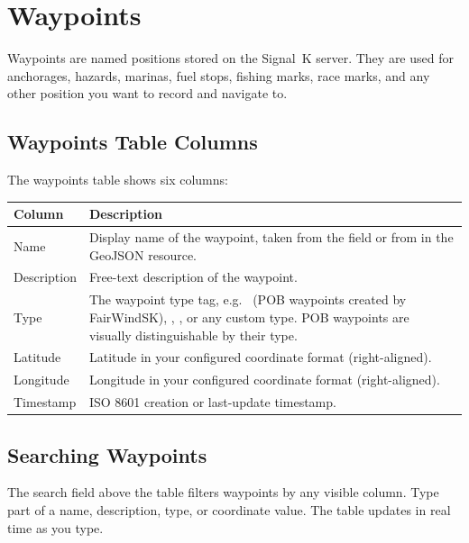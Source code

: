 \chapter{Waypoints}
\label{ch:waypoints}

Waypoints are named positions stored on the Signal~K server.
They are used for anchorages, hazards, marinas, fuel stops, fishing marks, race marks, and any
other position you want to record and navigate to.


\section{Waypoints Table Columns}

The waypoints table shows six columns:

\begin{longtable}{L{2.4cm} L{11.3cm}}
\toprule
{}
{\sffamily\bfseries\color{white} Column} &
{\sffamily\bfseries\color{white} Description} \\
\midrule
Name & Display name of the waypoint, taken from the  field or from  in the GeoJSON resource. \\
Description & Free-text description of the waypoint. \\
Type & The waypoint type tag, e.g.\  (POB waypoints created by FairWindSK), , , or any custom type. POB waypoints are visually distinguishable by their type. \\
Latitude & Latitude in your configured coordinate format (right-aligned). \\
Longitude & Longitude in your configured coordinate format (right-aligned). \\
Timestamp & ISO 8601 creation or last-update timestamp. \\
\bottomrule
\end{longtable}

\section{Searching Waypoints}

The search field above the table filters waypoints by any visible column.
Type part of a name, description, type, or coordinate value.
The table updates in real time as you type.

